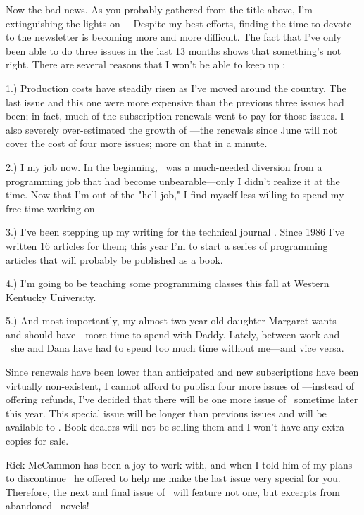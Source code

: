 Now the bad news.  As you probably gathered from the title above, I'm
extinguishing the lights on \LO\ \ Despite my best efforts, finding the time to
devote to the newsletter is becoming more and more difficult.
The fact that I've only been able to do three
issues in the last 13 months shows that something's not right. 
There are several reasons that I won't be able to keep up \LO:

\beginlist\parindent=18pt
\item{1.)}	Production costs have steadily risen as I've moved around the
		country.  The last issue and this one were more expensive than
		the previous three issues had been; in fact, much of the
		subscription renewals went to pay for those issues.  I also
		severely
		over-estimated the growth of \LO---the renewals since June
		will not cover the cost of four more issues; more on that in
		a minute.
\item{2.)}	I  my job now.  In the beginning, \LO\ was a
		much-needed diversion from a programming job that had become
		unbearable---only I didn't realize it at the time.  Now that
		I'm out of the "hell-job," I find myself less willing to spend
		my free time working on \LO
\item{3.)}	I've been stepping up my writing for the technical journal
		. Since 1986 I've written 16 articles
		for them; this year I'm to start a series of programming
		articles that will probably be published as a book.
\item{4.)}	I'm going to be teaching some programming classes this fall at
		Western Kentucky University.
\item{5.)}	And most importantly, my almost-two-year-old daughter Margaret
		wants---and should have---more
		time to spend with Daddy.  Lately, between work and \LO\ she
		and Dana have had to spend too much time without me---and vice
		versa.
\endlist

Since renewals have been lower than anticipated and new subscriptions have been
virtually non-existent, I cannot afford to publish four more issues of
\LO---instead of offering refunds, I've decided that there will be one more
issue of \LO\ sometime later this year.  This special issue will be longer than
previous issues and will be available to .
Book dealers will not be selling them and I won't have any extra copies for
sale.  

Rick McCammon has been a joy to work with, and when I told him of my plans
to discontinue \LO\ he offered to help me make the last issue very special
for you.  Therefore, the next and final issue of \LO\ will feature not one,
but  excerpts from abandoned \RRM\ novels!

